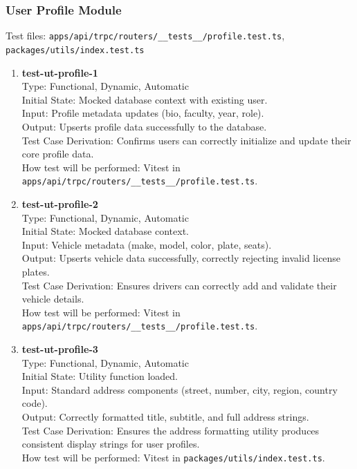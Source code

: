 \documentclass[12pt, titlepage]{article}
\begin{document}
\subsubsection{User Profile Module}

Test files: \texttt{apps/api/trpc/routers/\_\_tests\_\_/profile.test.ts}, \texttt{packages/utils/index.test.ts}

\begin{enumerate}
\item \textbf{test-ut-profile-1}\\
Type: Functional, Dynamic, Automatic\\
Initial State: Mocked database context with existing user.\\
Input: Profile metadata updates (bio, faculty, year, role).\\
Output: Upserts profile data successfully to the database.\\
Test Case Derivation: Confirms users can correctly initialize and update their core profile data.\\
How test will be performed: Vitest in \texttt{apps/api/trpc/routers/\_\_tests\_\_/profile.test.ts}.\\

\item \textbf{test-ut-profile-2}\\
Type: Functional, Dynamic, Automatic\\
Initial State: Mocked database context.\\
Input: Vehicle metadata (make, model, color, plate, seats).\\
Output: Upserts vehicle data successfully, correctly rejecting invalid license plates.\\
Test Case Derivation: Ensures drivers can correctly add and validate their vehicle details.\\
How test will be performed: Vitest in \texttt{apps/api/trpc/routers/\_\_tests\_\_/profile.test.ts}.\\

\item \textbf{test-ut-profile-3}\\
Type: Functional, Dynamic, Automatic\\
Initial State: Utility function loaded.\\
Input: Standard address components (street, number, city, region, country code).\\
Output: Correctly formatted title, subtitle, and full address strings.\\
Test Case Derivation: Ensures the address formatting utility produces consistent display strings for user profiles.\\
How test will be performed: Vitest in \texttt{packages/utils/index.test.ts}.\\


\end{enumerate}
\end{document}
